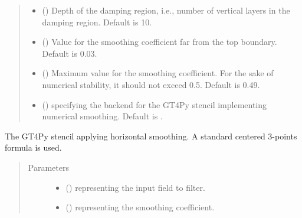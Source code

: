 \documentclass[letterpaper,10pt,english]{sphinxmanual}
\begin{document}
\begin{fulllineitems}
\begin{fulllineitems}
\begin{quote}
\begin{description}
\begin{itemize}
\item {} 
 () \textendash{} Depth of the damping region, i.e., number of vertical layers in the damping region. Default is 10.

\item {} 
 () \textendash{} Value for the smoothing coefficient far from the top boundary. Default is 0.03.

\item {} 
 () \textendash{} Maximum value for the smoothing coefficient. For the sake of numerical stability, it should not
exceed 0.5. Default is 0.49.

\item {} 
 () \textendash{}  specifying the backend for the GT4Py stencil implementing numerical
smoothing. Default is .

\end{itemize}

\end{description}\end{quote}

\end{fulllineitems}


\begin{fulllineitems}
\label{\detokenize{api:dycore.horizontal_smoothing.HorizontalSmoothingFirstOrderYZ._stencil_defs}}
The GT4Py stencil applying horizontal smoothing. A standard centered 3-points formula is used.
\begin{quote}\begin{description}
\item[{Parameters}] \leavevmode\begin{itemize}
\item {} 
 () \textendash{}  representing the input field to filter.

\item {} 
 () \textendash{}  representing the smoothing coefficient.


\end{itemize}
\end{description}
\end{quote}
\end{fulllineitems}
\end{fulllineitems}
\end{document}
